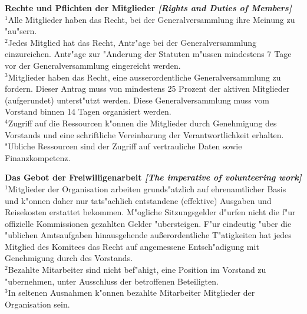 \documentclass[10pt]{article}
\newcounter{qcounter}
\begin{document}
\begin{list}{{\bf Artikel :~}}{}
\item {\bf Rechte und Pflichten der Mitglieder {\it[Rights and Duties of Members]}}\label{Duties}\\
$^{1}$Alle Mitglieder haben das Recht, bei der Generalversammlung ihre Meinung zu "au"sern. \\
$^{2}$Jedes Mitglied hat das Recht, Antr"age bei der Generalversammlung einzureichen. Antr"age zur "Anderung der Statuten m"ussen mindestens 7 Tage vor der Generalversammlung eingereicht werden.\\
$^{3}$Mitglieder haben das Recht, eine ausserordentliche Generalversammlung zu fordern. Dieser Antrag muss von mindestens 25 Prozent der aktiven Mitglieder (aufgerundet) unterst"utzt werden. Diese Generalversammlung muss vom Vorstand binnen 14 Tagen organisiert werden.\\
$^{4}$Zugriff auf die Ressourcen k"onnen die Mitglieder durch Genehmigung des Vorstands und eine schriftliche
Vereinbarung der Verantwortlichkeit erhalten. "Ubliche Ressourcen sind der Zugriff auf vertrauliche Daten sowie Finanzkompetenz.\\

\item {\bf Das Gebot der Freiwilligenarbeit {\it[The imperative of volunteering work]}}\\
$^{1}$Mitglieder der Organisation arbeiten grunds"atzlich auf ehrenamtlicher Basis und k"onnen daher nur tats"achlich entstandene (effektive) Ausgaben und Reisekosten erstattet bekommen. M"ogliche Sitzungsgelder d"urfen nicht die f"ur offizielle Kommissionen gezahlten Gelder "ubersteigen. F"ur eindeutig "uber die "ublichen Amtsaufgaben hinausgehende außerordentliche T"atigkeiten hat jedes Mitglied des Komitees das Recht auf angemessene Entsch"adigung mit Genehmigung durch des Vorstands.\\
$^{2}$Bezahlte Mitarbeiter sind nicht bef"ahigt, eine Position im Vorstand zu "ubernehmen, unter Ausschluss der betroffenen Beteiligten.\\
$^{3}$In seltenen Ausnahmen k"onnen bezahlte Mitarbeiter Mitglieder der Organisation sein.\\


\end{list}
\end{document}
